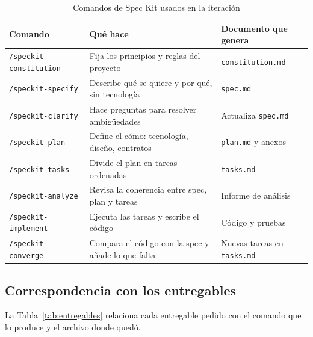\documentclass[12pt,a4paper]{article}
\begin{document}
\begin{table}[H]
\centering
\small
{}
\begin{tabular}{@{}P{4.4cm}P{5.8cm}P{4.8cm}@{}}
\toprule
\textbf{Comando} & \textbf{Qué hace} & \textbf{Documento que genera} \\
\midrule
\texttt{/speckit-constitution} & Fija los principios y reglas del proyecto & \texttt{constitution.md} \\
\texttt{/speckit-specify} & Describe qué se quiere y por qué, sin tecnología & \texttt{spec.md} \\
\texttt{/speckit-clarify} & Hace preguntas para resolver ambigüedades & Actualiza \texttt{spec.md} \\
\texttt{/speckit-plan} & Define el cómo: tecnología, diseño, contratos & \texttt{plan.md} y anexos \\
\texttt{/speckit-tasks} & Divide el plan en tareas ordenadas & \texttt{tasks.md} \\
\texttt{/speckit-analyze} & Revisa la coherencia entre spec, plan y tareas & Informe de análisis \\
\texttt{/speckit-implement} & Ejecuta las tareas y escribe el código & Código y pruebas \\
\texttt{/speckit-converge} & Compara el código con la spec y añade lo que falta & Nuevas tareas en \texttt{tasks.md} \\
\bottomrule
\end{tabular}
\caption{Comandos de Spec Kit usados en la iteración}
\end{table}

\subsection{Correspondencia con los entregables}
La Tabla~\ref{tab:entregables} relaciona cada entregable pedido con el comando que lo produce y el archivo donde quedó.
\end{document}
